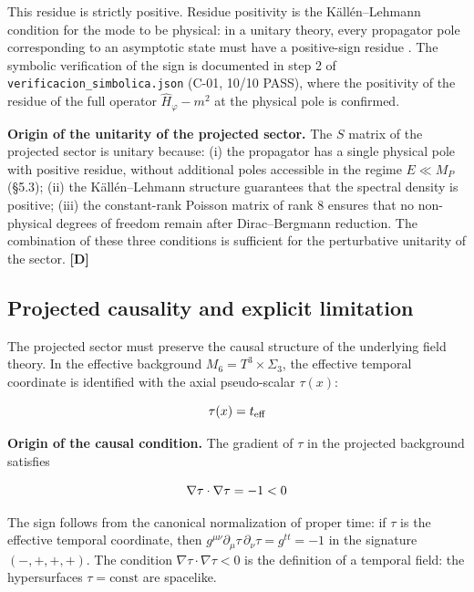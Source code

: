 ﻿\documentclass[11pt,letterpaper]{article}
\begin{document}
This residue is strictly positive. Residue positivity is the Källén--Lehmann condition for the mode to be physical: in a unitary theory, every propagator pole corresponding to an asymptotic state must have a positive-sign residue \cite{Kallen1952,Lehmann1954}. The symbolic verification of the sign is documented in step 2 of \texttt{verificacion\_simbolica.json} (C-01, 10/10 PASS), where the positivity of the residue of the full operator $\hat{H}_\varphi - m^2$ at the physical pole is confirmed.

\textbf{Origin of the unitarity of the projected sector.} The $S$ matrix of the projected sector is unitary because: (i) the propagator has a single physical pole with positive residue, without additional poles accessible in the regime $E \ll M_P$ (§5.3); (ii) the Källén--Lehmann structure guarantees that the spectral density is positive; (iii) the constant-rank Poisson matrix of rank $8$ ensures that no non-physical degrees of freedom remain after Dirac--Bergmann reduction. The combination of these three conditions is sufficient for the perturbative unitarity of the sector. \textbf{[D]}
\subsection{Projected causality and explicit limitation}
The projected sector must preserve the causal structure of the underlying field theory. In the effective background $M_6 = T^3 \times \Sigma_3$, the effective temporal coordinate is identified with the axial pseudo-scalar $\tau(x)$:

\begin{equation*}
  \resizebox{\ifdim\width>\linewidth \linewidth\else\width\fi}{!}{$\displaystyle \tau(x) = t_{\text{eff}}$}
\end{equation*}

\textbf{Origin of the causal condition.} The gradient of $\tau$ in the projected background satisfies

\begin{equation*}
  \resizebox{\ifdim\width>\linewidth \linewidth\else\width\fi}{!}{$\displaystyle \nabla\tau \cdot \nabla\tau = -1 < 0$}
\end{equation*}

The sign follows from the canonical normalization of proper time: if $\tau$ is the effective temporal coordinate, then $g^{\mu\nu}\partial_\mu\tau\,\partial_\nu\tau = g^{tt} = -1$ in the signature $(-,+,+,+)$. The condition $\nabla\tau \cdot \nabla\tau < 0$ is the definition of a temporal field: the hypersurfaces $\tau = \text{const}$ are spacelike.
\end{document}
